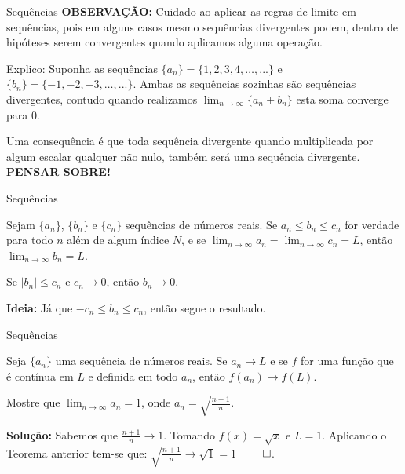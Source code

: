 \documentclass[hyperref={pdfpagelabels=false}]{beamer}
\begin{document}
\begin{frame}{Sequências}
 {\bf OBSERVAÇÃO:} Cuidado ao aplicar as regras de limite em sequências, pois em alguns casos mesmo sequências divergentes podem, dentro de hipóteses serem convergentes quando aplicamos alguma operação. \pause
 
 Explico: Suponha as sequências $\{a_n\} = \{1,2,3,4,\dots,...\}$ e $\{b_n\} = \{-1,-2,-3,\dots,...\}$. Ambas as sequências sozinhas são sequências divergentes, contudo quando realizamos $\displaystyle \lim_{n \to \infty}\{a_n + b_n\}$ esta soma converge para $0$.  \pause
 
 Uma consequência é que toda sequência divergente quando multiplicada por algum escalar qualquer não nulo, também será uma sequência divergente. {\bf PENSAR SOBRE!}
\end{frame}

\begin{frame}{Sequências}
  \begin{theorem}
   Sejam $\{a_n\}$, $\{b_n\}$ e $\{c_n\}$ sequências de números reais. Se $a_n \leq b_n \leq c_n$ for verdade para todo $n$ além de algum índice $N$, e se $\displaystyle \lim_{n \to \infty} a_n = \displaystyle \lim_{n \to \infty} c_n = L$, então $\displaystyle \lim_{n \to \infty} b_n = L$.
  \end{theorem}\pause
  \begin{corollary}
   Se $|b_n| \leq c_n$ e $c_n \to 0$, então $b_n \to 0$.
  \end{corollary}\pause
  
  {\bf Ideia:} Já que $-c_n \leq b_n \leq c_n$, então segue o resultado.


\end{frame}

\begin{frame}{Sequências}
 \begin{theorem}
  Seja $\{a_n\}$ uma sequência de números reais. Se $a_n \to L$ e se $f$ for uma função que é contínua em $L$ e definida em todo $a_n$, então $f(a_n) \to f(L)$.
 \end{theorem} \pause
 
 \begin{example}
  Mostre que $\displaystyle \lim_{n \to \infty} a_n = 1$, onde $a_n = \sqrt{\displaystyle \frac{n+1}{n}}$.
 \end{example} \pause
 
 {\bf Solução:} \pause Sabemos que $\displaystyle \frac{n+1}{n} \to 1$. Tomando $f(x) = \sqrt{x}$ e $L=1$. Aplicando o Teorema anterior tem-se que: $\sqrt{\displaystyle \frac{n+1}{n}} \to \sqrt{1} = 1$ $\qed$.


\end{frame}
\end{document}
